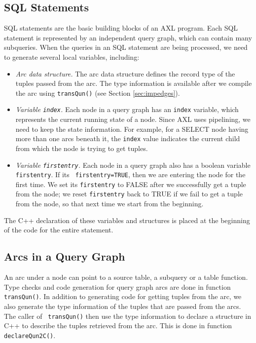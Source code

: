 \subsection{SQL Statements}
SQL statements are the basic building blocks of an AXL program. Each
SQL statement is represented by an independent query graph, which can
contain many subqueries. When the queries in an SQL statement are
being processed, we need to generate several local variables,
including:

\begin{itemize}
\item {\it Arc data structure.} The arc data structure defines the
  record type of the tuples passed from the arc. The type information
  is available after we compile the arc using {\tt transQun()} (see
  Section \ref{sec:impedges}).
\item {\it Variable {\tt index}.}  Each node in a query graph has an
  {\tt index} variable, which represents the current running state of
  a node. Since AXL uses pipelining, we need to keep the state
  information. For example, for a SELECT node having more than one
  arcs beneath it, the {\tt index} value indicates the current child
  from which the node is trying to get tuples.
\item {\it Variable {\tt firstentry}.} Each node in a query graph also
  has a boolean variable {\tt firstentry}. If its {\tt
    firstentry=TRUE}, then we are entering the node for the first
  time.  We set its {\tt firstentry} to FALSE after we successfully
  get a tuple from the node; we reset {\tt firstentry} back to TRUE if
  we fail to get a tuple from the node, so that next time we start
  from the beginning.
\end{itemize}

The C++ declaration of these variables and structures is placed at the
beginning of the code for the entire statement.

\subsection{Arcs in a Query Graph\label{sec:impedges}}
An arc under a node can point to a source table, a subquery or a table
function. Type checks and code generation for query graph arcs are
done in function {\tt transQun()}. In addition to generating code for
getting tuples from the arc, we also generate the type information of
the tuples that are passed from the arcs. The caller of {\tt
  transQun()} then use the type information to declare a structure in
C++ to describe the tuples retrieved from the arc. This is done in
function {\tt declareQun2C()}.

